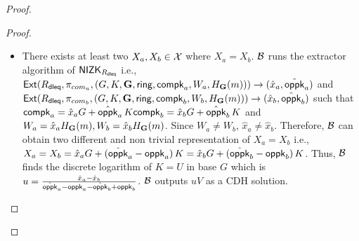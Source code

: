 \begin{proof}
\begin{proof}
\begin{itemize}
				
				\item There exists at least two $ X_a,X_b \in {\ensuremath{\mathcal{X}}} $ where $ X_a = X_b $. $ \mathcal{B} $ runs the extractor algorithm of $ {\mathsf{NIZK}}_{R_{\mathsf{dleq}}} $ i.e., $ \mathsf{Ext}(R_{\mathsf{dleq}},\pi_{com_a},(G,K,{\mathbf{G}},\mathsf{ring}, \mathsf{compk}_a,W_a,H_{\mathbf{G}}(m))) \rightarrow (\hat{x}_a,\hat{\mathsf{oppk}}_a )$ and $ \mathsf{Ext}(R_{\mathsf{dleq}},\pi_{com_b},(G,K,{\mathbf{G}},\mathsf{ring}, \mathsf{compk}_b,W_b,H_{\mathbf{G}}(m))) \rightarrow (\hat{x}_b,\hat{\mathsf{oppk}}_b )$ such that $ \mathsf{compk}_a = \hat{x}_aG + \hat{\mathsf{oppk}}_a \, K \mathsf{compk}_b = \hat{x}_bG + \hat{\mathsf{oppk}}_b \, K $ and $ W_a = \hat{x}_a H_{\mathbf{G}}(m), W_b = \hat{x}_b H_{\mathbf{G}}(m) $. Since $ W_a \neq W_b $, $ \hat{x}_a \neq \hat{x}_b $.  Therefore, $ \mathcal{B} $ can obtain  two different and non trivial representation of $ X_a = X_b $ i.e., $ X_a = X_b = \hat{x}_aG + (\hat{\mathsf{oppk}}_a - \mathsf{oppk}_a) \, K = \hat{x}_bG + (\hat{\mathsf{oppk}}_b - \mathsf{oppk}_b) \, K  $. Thus, $ \mathcal{B} $ finds the discrete logarithm of $ K = U $ in base $ G $ which is $ u = \frac{\hat{x}_a - \hat{x}_b}{\hat{\mathsf{oppk}}_a -\mathsf{oppk}_a -\hat{\mathsf{oppk}}_b + \mathsf{oppk}_b} $. $ \mathcal{B} $ outputs $ uV $ as a CDH solution.
			\end{itemize}
			
			
			
			
			
			
			
			
			
			
			
			
			

\end{proof}
\end{proof}
